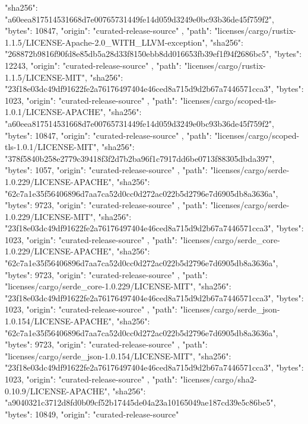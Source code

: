 {{      "sha256": "a60eea817514531668d7e00765731449fe14d059d3249e0bc93b36de45f759f2",
      "bytes": 10847,
      "origin": "curated-release-source"
    },
    {
      "path": "licenses/cargo/rustix-1.1.5/LICENSE-Apache-2.0_WITH_LLVM-exception",
      "sha256": "268872b9816f90fd8e85db5a28d33f8150ebb8dd016653fb39ef1f94f2686bc5",
      "bytes": 12243,
      "origin": "curated-release-source"
    },
    {
      "path": "licenses/cargo/rustix-1.1.5/LICENSE-MIT",
      "sha256": "23f18e03dc49df91622fe2a76176497404e46ced8a715d9d2b67a7446571cca3",
      "bytes": 1023,
      "origin": "curated-release-source"
    },
    {
      "path": "licenses/cargo/scoped-tls-1.0.1/LICENSE-APACHE",
      "sha256": "a60eea817514531668d7e00765731449fe14d059d3249e0bc93b36de45f759f2",
      "bytes": 10847,
      "origin": "curated-release-source"
    },
    {
      "path": "licenses/cargo/scoped-tls-1.0.1/LICENSE-MIT",
      "sha256": "378f5840b258e2779c39418f3f2d7b2ba96f1c7917dd6be0713f88305dbda397",
      "bytes": 1057,
      "origin": "curated-release-source"
    },
    {
      "path": "licenses/cargo/serde-1.0.229/LICENSE-APACHE",
      "sha256": "62c7a1e35f56406896d7aa7ca52d0cc0d272ac022b5d2796e7d6905db8a3636a",
      "bytes": 9723,
      "origin": "curated-release-source"
    },
    {
      "path": "licenses/cargo/serde-1.0.229/LICENSE-MIT",
      "sha256": "23f18e03dc49df91622fe2a76176497404e46ced8a715d9d2b67a7446571cca3",
      "bytes": 1023,
      "origin": "curated-release-source"
    },
    {
      "path": "licenses/cargo/serde_core-1.0.229/LICENSE-APACHE",
      "sha256": "62c7a1e35f56406896d7aa7ca52d0cc0d272ac022b5d2796e7d6905db8a3636a",
      "bytes": 9723,
      "origin": "curated-release-source"
    },
    {
      "path": "licenses/cargo/serde_core-1.0.229/LICENSE-MIT",
      "sha256": "23f18e03dc49df91622fe2a76176497404e46ced8a715d9d2b67a7446571cca3",
      "bytes": 1023,
      "origin": "curated-release-source"
    },
    {
      "path": "licenses/cargo/serde_json-1.0.154/LICENSE-APACHE",
      "sha256": "62c7a1e35f56406896d7aa7ca52d0cc0d272ac022b5d2796e7d6905db8a3636a",
      "bytes": 9723,
      "origin": "curated-release-source"
    },
    {
      "path": "licenses/cargo/serde_json-1.0.154/LICENSE-MIT",
      "sha256": "23f18e03dc49df91622fe2a76176497404e46ced8a715d9d2b67a7446571cca3",
      "bytes": 1023,
      "origin": "curated-release-source"
    },
    {
      "path": "licenses/cargo/sha2-0.10.9/LICENSE-APACHE",
      "sha256": "a9040321c3712d8fd0b09cf52b17445de04a23a10165049ae187cd39e5c86be5",
      "bytes": 10849,
      "origin": "curated-release-source"
}}

